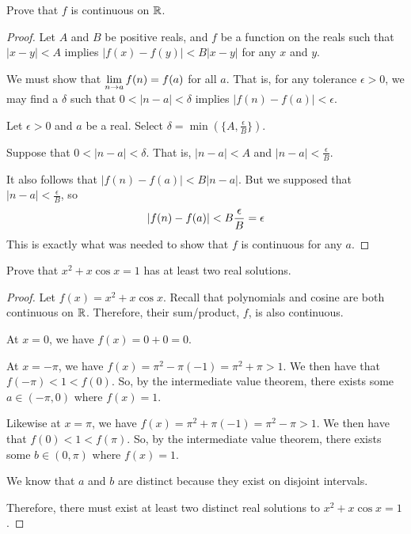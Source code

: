 Prove that $f$ is continuous on $\mathbb{R}$.
\begin{proof}
  Let $A$ and $B$ be positive reals, and $f$ be a function on the reals such that
  $|x-y| < A$ implies $|f(x)-f(y)| < B|x-y|$ for any $x$ and $y$.

  We must show that $\displaystyle\lim_{n\to a}f(n)=f(a)$ for all $a$.
  That is, for any tolerance $\epsilon > 0$,
  we may find a $\delta$ such that $0 < |n-a| < \delta$ implies $|f(n)-f(a)| < \epsilon$.

  Let $\epsilon > 0$ and $a$ be a real. Select $\delta = \min(\{A,\frac{\epsilon}{B}\})$.

  Suppose that $0 < |n-a| < \delta$.
  That is, $|n-a| < A$ and $|n-a| < \frac{\epsilon}{B}$.

  It also follows that $|f(n)-f(a)| < B|n-a|$.
  But we supposed that $|n-a| < \frac{\epsilon}{B}$, so
  \[ \abs{f(n)-f(a)} < B\frac{\epsilon}{B} = \epsilon \]
  This is exactly what was needed to show that $f$ is continuous for any $a$.
\end{proof}

\question Prove that $x^2+x\cos x = 1$ has at least two real solutions.
\begin{proof}
  Let $f(x) = x^2+x\cos x$.
  Recall that polynomials and cosine are both continuous on $\mathbb{R}$.
  Therefore, their sum/product, $f$, is also continuous.

  At $x=0$, we have $f(x)=0+0=0$.

  At $x=-\pi$, we have $f(x)=\pi^2-\pi(-1)=\pi^2+\pi > 1$.
  We then have that $f(-\pi) < 1 < f(0)$.
  So, by the intermediate value theorem, there exists some $a\in(-\pi,0)$ where $f(x)=1$.

  Likewise at $x=\pi$, we have $f(x)=\pi^2+\pi(-1)=\pi^2-\pi > 1$.
  We then have that $f(0) < 1 < f(\pi)$.
  So, by the intermediate value theorem, there exists some $b\in(0,\pi)$ where $f(x)=1$.

  We know that $a$ and $b$ are distinct because they exist on disjoint intervals.

  Therefore, there must exist at least two distinct real solutions to $x^2+x\cos x=1$.
\end{proof}


